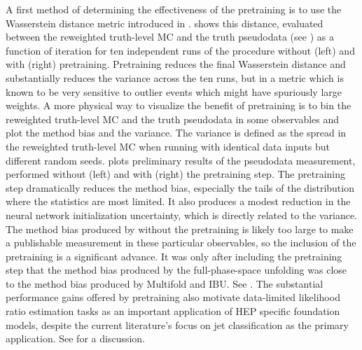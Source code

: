 A first method of determining the effectiveness of the pretraining is to use the Wasserstein distance metric introduced in .
 shows this distance, evaluated between the reweighted truth-level MC and the truth pseudodata (see ) as a function of \Omnifold iteration for ten independent runs of the procedure without (left) and with (right) pretraining.
Pretraining reduces the final Wasserstein distance and substantially reduces the variance across the ten runs, but in a metric which is known to be very sensitive to outlier events which might have spuriously large weights.
A more physical way to visualize the benefit of pretraining is to bin the reweighted truth-level MC and the truth pseudodata in some observables and plot the method bias and the variance.
The variance is defined as the spread in the reweighted truth-level MC when running \Omnifold with identical data inputs but different random seeds.
 plots preliminary results of the pseudodata measurement, performed without (left) and with (right) the pretraining step.
The pretraining step dramatically reduces the method bias, especially the tails of the distribution where the statistics are most limited.
It also produces a modest reduction in the neural network initialization uncertainty, which is directly related to the variance.
The method bias produced by \Omnifold without the pretraining is likely too large to make a publishable measurement in these particular observables, so the inclusion of the pretraining is a significant advance.
It was only after including the pretraining step that the method bias produced by the full-phase-space unfolding was close to the method bias produced by Multifold and IBU.
See .
The substantial performance gains offered by pretraining also motivate data-limited likelihood ratio estimation tasks as an important application of HEP specific foundation models, despite the current literature's focus on jet classification as the primary application.
See  for a discussion.

